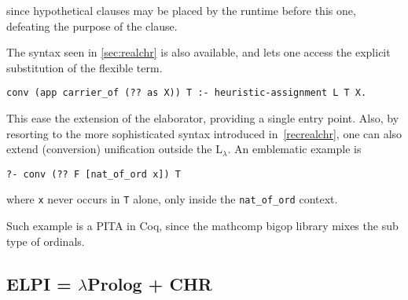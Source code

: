 \documentclass{easychair}
\begin{document}
since hypothetical clauses may be placed by the runtime before this one,
defeating the purpose of the clause.

The syntax seen in \ref{sec:realchr} is also available, and lets one access
the explicit substitution of the flexible term.

\begin{verbatim}
conv (app carrier_of (?? as X)) T :- heuristic-assignment L T X.
\end{verbatim}

This ease the extension of the elaborator, providing a single entry point.
Also, by resorting to the more sophisticated syntax introduced 
in~\ref{recrealchr}, one can also extend (conversion) unification
outside the L$_\lambda$.  An emblematic example is

\begin{verbatim}
?- conv (?? F [nat_of_ord x]) T
\end{verbatim}

where \verb+x+ never occurs in \verb+T+ alone, only inside the
\verb+nat_of_ord+ context.

Such example is a PITA in Coq, since the mathcomp bigop library
mixes the sub type of ordinals.

\subsection{ELPI = $\lambda$Prolog + CHR}\label{sec:elpi}
\end{document}
